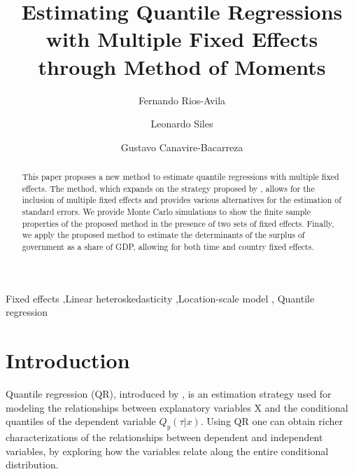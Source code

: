 \documentclass[
  authoryear,
  review,
  1p]{elsarticle}
\begin{document}
\begin{frontmatter}
\title{Estimating Quantile Regressions with Multiple Fixed Effects
through Method of Moments }
\author[1]{Fernando Rios-Avila%
%
}
\author[2]{Leonardo Siles%
%
}
\author[3]{Gustavo Canavire-Bacarreza%
%
}





        
\begin{abstract}
This paper proposes a new method to estimate quantile regressions with
multiple fixed effects. The method, which expands on the strategy
proposed by \citet{mss2019}, allows for the inclusion of multiple fixed
effects and provides various alternatives for the estimation of standard
errors. We provide Monte Carlo simulations to show the finite sample
properties of the proposed method in the presence of two sets of fixed
effects. Finally, we apply the proposed method to estimate the
determinants of the surplus of government as a share of GDP, allowing
for both time and country fixed effects.
\end{abstract}





\begin{keyword}
    Fixed effects \sep Linear heteroskedasticity \sep Location-scale
model \sep 
    Quantile regression
\end{keyword}
\end{frontmatter}
    
\section{Introduction}\label{introduction}

Quantile regression (QR), introduced by \citet{koenkerbasset1978}, is an
estimation strategy used for modeling the relationships between
explanatory variables X and the conditional quantiles of the dependent
variable \(Q_y (\tau|x)\). Using QR one can obtain richer
characterizations of the relationships between dependent and independent
variables, by exploring how the variables relate along the entire
conditional distribution.
\end{document}
